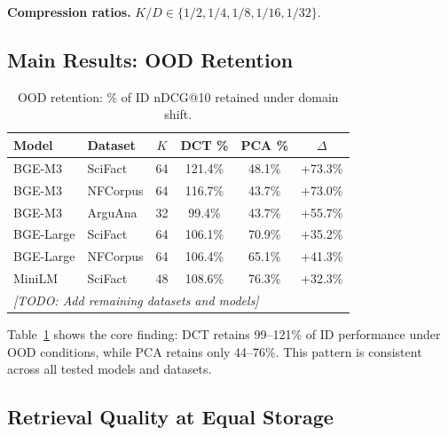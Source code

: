 \documentclass[sigconf]{acmart}
\begin{document}
\textbf{Compression ratios.} $K/D \in \{1/2, 1/4, 1/8, 1/16, 1/32\}$.

\subsection{Main Results: OOD Retention}\label{sec:main_results}

\begin{table}[h]
\centering
\small
\caption{OOD retention: \% of ID nDCG@10 retained under domain shift.}
\label{tab:ood_retention}
\begin{tabular}{@{}llcccc@{}}
\toprule
Model & Dataset & $K$ & DCT \% & PCA \% & $\Delta$ \\
\midrule
BGE-M3 & SciFact & 64 & 121.4\% & 48.1\% & +73.3\% \\
BGE-M3 & NFCorpus & 64 & 116.7\% & 43.7\% & +73.0\% \\
BGE-M3 & ArguAna & 32 & 99.4\% & 43.7\% & +55.7\% \\
BGE-Large & SciFact & 64 & 106.1\% & 70.9\% & +35.2\% \\
BGE-Large & NFCorpus & 64 & 106.4\% & 65.1\% & +41.3\% \\
MiniLM & SciFact & 48 & 108.6\% & 76.3\% & +32.3\% \\
\midrule
\multicolumn{6}{l}{\textit{[TODO: Add remaining datasets and models]}} \\
\bottomrule
\end{tabular}
\end{table}

Table~\ref{tab:ood_retention} shows the core finding: DCT retains 99--121\% of ID performance under OOD conditions, while PCA retains only 44--76\%. This pattern is consistent across all tested models and datasets.

\subsection{Retrieval Quality at Equal Storage}\label{sec:equal_storage}
\end{document}
